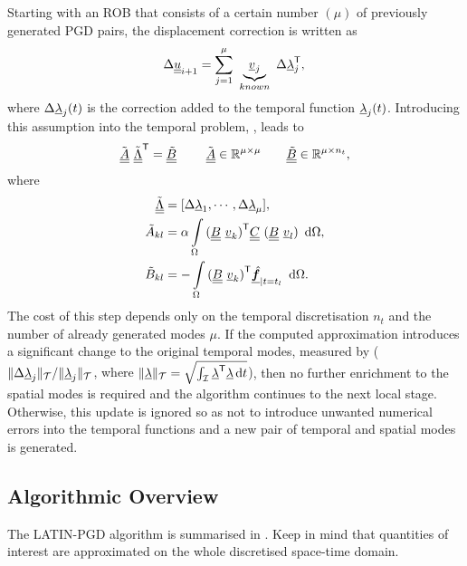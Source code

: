 Starting with an ROB that consists of a certain number $(\mu)$ of previously generated PGD pairs, the displacement correction is written as
\begin{equation}
	\Delta \underline{\underline{u}}_{i+1}^{{\rm{}}} = \sum_{j=1}^{\mu} \ \underbrace{\underline{v}_j}_{known}\ \Delta {\underline{\lambda}}^{\sf T}_j   ,\\
\end{equation}
where $\Delta \underline{\lambda}_j(t)$ is the correction added to the temporal function $\underline{\lambda}_j(t)$. Introducing this assumption into the temporal problem, , leads to
\begin{equation}
	{\tilde{\underline{\underline{A}}}}\ {\underline{\underline{{\tilde{\Lambda}}}}}^{\sf T} = \underline{\underline{{\tilde{B}}}}  \qquad\ {\tilde{\underline{\underline{A}}}} \in {\mathbb{ R}}^{\mu \times \mu} \qquad \underline{\underline{{\tilde{B}}}} \in {\mathbb{ R}}^{\mu  \times n_t},
	\label{eq_time_update}
\end{equation}
where
\begin{equation}
	\begin{split}
		{\tilde{\underline{\underline{\Lambda}}}}  &= {[\Delta\underline{\lambda}_{1},\cdots,\Delta\underline{\lambda}_{\mu}]} ,\\
		{\tilde{A}}_{kl}  &= \alpha \int \displaylimits_\Omega {(\underline{\underline{B}} \ \underline{v}_k)}^{\sf T} \underline{\underline{C}}\ (\underline{\underline{B}}\ \underline{v}_l)\ {\,\rm d} \Omega ,\\
		{{\tilde{B}}}_{kl}  &= - \int \displaylimits_\Omega {(\underline{\underline{B}} \ \underline{v}_k)}^{\sf T} \underline{\mbox{\ensuremath{\hat{\bm f}}}}_{|t=t_l} \   {\,\rm d} \Omega.
	\end{split}
\end{equation}
The cost of this step depends only on the temporal discretisation $n_t$ and the number of already generated modes $\mu$. If the computed approximation introduces a significant change to the original temporal modes, measured by {($\lVert \Delta \underline{\lambda}_j \rVert_{\cal T} / \lVert {\underline{\lambda}_j} \rVert_{\cal T}$, where $\lVert {\underline{\lambda}} \rVert_{\cal T} = \sqrt{ \int \displaylimits_{{\cal I}} {\underline{\lambda}}^{\sf T} {\underline{\lambda}} {\,\rm d} t }$)}, then no further enrichment to the spatial modes is required and the algorithm continues to the next local stage. Otherwise, this update is ignored {so} as not to introduce unwanted numerical errors into the temporal functions and a new pair of temporal and spatial modes is generated.

\subsection{Algorithmic Overview}
\label{sec_algorithmic_overview}
The LATIN-PGD algorithm is summarised in . Keep in mind that quantities of interest are approximated on the whole discretised space-time domain.

